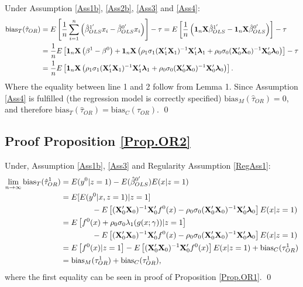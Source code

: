 \documentclass[11pt]{article}
\newcommand{\X}{{\bf X}}
\newcommand{\y}{{\bf y}}
\newcommand{\limes}{\lim \limits_{n\to\infty}}
\newcommand{\bias}{\mbox{bias}}
\begin{document}
\vspace{5mm}
\noindent Under Assumption \ref{Ass1b}, \ref{Ass2b}, \ref{Ass3} and \ref{Ass4}: 
\begin{align*}
\mbox{bias}_T(\hat \tau_{OR})&=E\left[\frac{1}{n}\sum \limits_{i =1}^n\left( \hat\beta^{1'}_{OLS}x_i-\hat\beta^{0'}_{OLS}x_i\right)\right] -\tau=E\left[\frac{1}{n}\left({\bf1}_n \X \hat\beta^{1'}_{OLS}- {\bf1}_n \X \hat\beta^{0'}_{OLS}\right)\right] - \tau\\
&=\frac{1}{n}E\left[ {\bf1}_n \X \left(  \beta^1 - \beta^0 \right) +  {\bf1}_n \X  \left(\rho_1\sigma_1(\X_1'\X_1)^{-1}\X_1' \boldsymbol\lambda_1 +\rho_0\sigma_0(\X_0'\X_0)^{-1}\X_0' \boldsymbol \lambda_0 \right)\right]-\tau\\
&= \frac{1}{n}E\left[ {\bf1}_n \X  \left(\rho_1\sigma_1(\X_1'\X_1)^{-1}\X_1' \boldsymbol\lambda_1 +\rho_0\sigma_0(\X_0'\X_0)^{-1}\X_0' \boldsymbol \lambda_0 \right)\right].
\end{align*}
Where the equality between line 1 and 2 follow from Lemma 1. Since Assumption \ref{Ass4} is fulfilled (the regression model is correctly specified) $\bias_M(\hat \tau_{OR})=0$, and therefore $\bias_T(\hat \tau_{OR})=\bias_C(\hat \tau_{OR})$. \qed


\subsection*{Proof Proposition \ref{Prop.OR2}}
Under, Assumption \ref{Ass1b}, \ref{Ass3} and Regularity Assumption \ref{RegAss1}: 
\begin{align*}
\limes \bias_T(\hat \tau^1_{OR}) &=E(y^0|z=1)  -E(\hat\beta^{0'}_{OLS}) E(x |z=1)\\
&=E[ E(y^0|x,z=1) |z=1] \\
&\qquad\qquad- E\left[(\X_0'\X_0)^{-1}\X_0' f^0(x) - \rho_0 \sigma_0(\X_0'\X_0)^{-1}\X_0'  {\boldsymbol \lambda_0 } \right] E(x|z=1) \\
&=E\left[ f^0(x) + \rho_0\sigma_0 \lambda_1(g(x; \gamma)) |z=1\right] \\
&\qquad\qquad- E\left[(\X_0'\X_0)^{-1}\X_0' f^0(x) - \rho_0 \sigma_0(\X_0'\X_0)^{-1}\X_0'  {\boldsymbol \lambda_0 } \right] E(x|z=1) \\
&=E\left[ f^0(x) |z=1\right] - E\left[(\X_0'\X_0)^{-1}\X_0' f^0(x) \right] E(x|z=1) +\mbox{bias}_C(\tau_{OR}^1)\\
&=\mbox{bias}_M(\tau_{OR}^1) +\mbox{bias}_C(\tau_{OR}^1),
\end{align*}
where the first equality can be seen in proof of Proposition \ref{Prop.OR1}.  \qed
\end{document}

